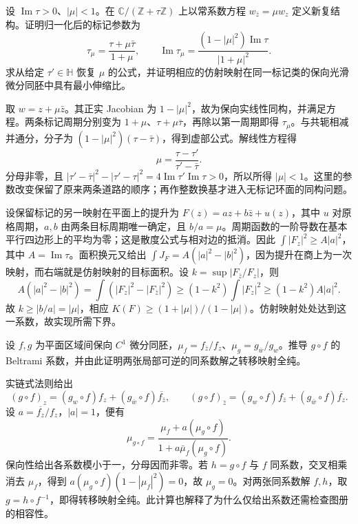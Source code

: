 \BookExercises
\begin{exercise}
	\label{g4:ex:0602:constant-torus}
	设 \(\operatorname{Im}\tau>0\)、\(|\mu|<1\)。在 \(\mathbb C/(\mathbb Z+\tau\mathbb Z)\) 上以常系数方程 \(w_{\bar z}=\mu w_z\) 定义新复结构。证明归一化后的标记参数为
	\[
		\tau_\mu=\frac{\tau+\mu\bar\tau}{1+\mu},\qquad
		\operatorname{Im}\tau_\mu=\frac{(1-|\mu|^2)\operatorname{Im}\tau}{|1+\mu|^2}.
	\]
	求从给定 \(\tau'\in\mathbb H\) 恢复 \(\mu\) 的公式，并证明相应的仿射映射在同一标记类的保向光滑微分同胚中具有最小伸缩比。
\end{exercise}
\begin{solution}
	取 \(w=z+\mu\bar z\)。其正实 Jacobian 为 \(1-|\mu|^2\)，故为保向实线性同构，并满足方程。两条标记周期分别变为 \(1+\mu\)、\(\tau+\mu\bar\tau\)，再除以第一周期即得 \(\tau_\mu\)。与共轭相减并通分，分子为 \((1-|\mu|^2)(\tau-\bar\tau)\)，得到虚部公式。解线性方程得
	\[
		\mu=\frac{\tau-\tau'}{\tau'-\bar\tau}.
	\]
	分母非零，且 \(|\tau'-\bar\tau|^2-|\tau'-\tau|^2=4\operatorname{Im}\tau'\operatorname{Im}\tau>0\)，所以所得 \(|\mu|<1\)。这里的参数改变保留了原来两条道路的顺序；再作整数换基才进入无标记环面的同构问题。

	设保留标记的另一映射在平面上的提升为 \(F(z)=az+b\bar z+u(z)\)，其中 \(u\) 对原格周期，\(a,b\) 由两条目标周期唯一确定，且 \(b/a=\mu\)。周期函数的一阶导数在基本平行四边形上的平均为零；这是散度公式与相对边的抵消。因此 \(\int|F_z|^2\ge A|a|^2\)，其中 \(A=\operatorname{Im}\tau\)。面积换元又给出 \(\int J_F=A(|a|^2-|b|^2)\)，因为提升在商上为一次映射，而右端就是仿射映射的目标面积。设 \(k=\sup|F_{\bar z}/F_z|\)，则
	\[
		A(|a|^2-|b|^2)=\int(|F_z|^2-|F_{\bar z}|^2)
		\ge(1-k^2)\int|F_z|^2\ge(1-k^2)A|a|^2.
	\]
	故 \(k\ge|b/a|=|\mu|\)，相应 \(K(F)\ge(1+|\mu|)/(1-|\mu|)\)。仿射映射处处达到这一系数，故实现所需下界。
\end{solution}

\begin{exercise}
	设 \(f,g\) 为平面区域间保向 \(C^1\) 微分同胚，\(\mu_f=f_{\bar z}/f_z\)、\(\mu_g=g_{\bar w}/g_w\)。推导 \(g\circ f\) 的 Beltrami 系数，并由此证明两张局部可逆的同系数解之转移映射全纯。
\end{exercise}
\begin{solution}
	实链式法则给出
	\[
		(g\circ f)_z=(g_w\circ f)f_z+(g_{\bar w}\circ f)\overline{f_{\bar z}},\qquad
		(g\circ f)_{\bar z}=(g_w\circ f)f_{\bar z}+(g_{\bar w}\circ f)\overline{f_z}.
	\]
	设 \(a=\overline{f_z}/f_z\)，\(|a|=1\)，便有
	\[
		\mu_{g\circ f}=\frac{\mu_f+a(\mu_g\circ f)}{1+a\bar\mu_f(\mu_g\circ f)}.
	\]
	保向性给出各系数模小于一，分母因而非零。若 \(h=g\circ f\) 与 \(f\) 同系数，交叉相乘消去 \(\mu_f\)，得到 \(a(\mu_g\circ f)(1-|\mu_f|^2)=0\)，故 \(\mu_g=0\)。对两张同系数解 \(f,h\)，取 \(g=h\circ f^{-1}\)，即得转移映射全纯。此计算也解释了为什么仅给出系数还需检查图册的相容性。
\end{solution}

